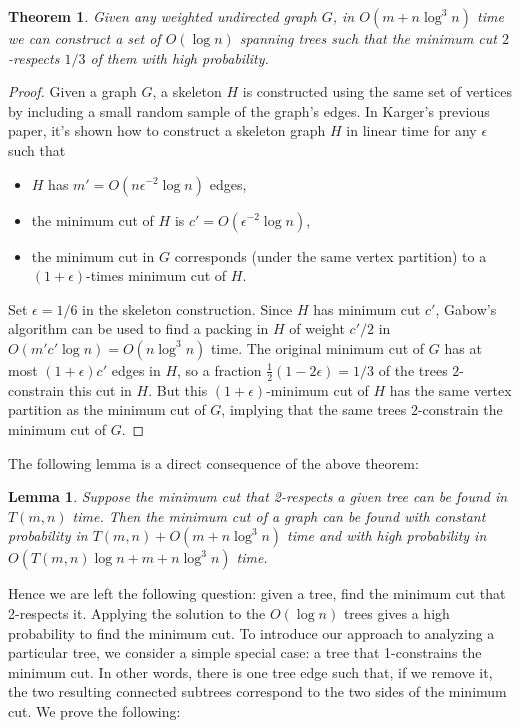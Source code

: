 \documentclass[12pt]{article}
\theoremstyle{plain}
\newtheorem{lemma}{Lemma}[section]
\newtheorem{theorem}{Theorem}[section]
\begin{document}
\begin{theorem}
    \label{theorem:2respect}
    Given any weighted undirected graph $G$, in $O(m+n\log^3 n)$ time we can construct a set of $O(\log n)$ spanning trees such that the minimum cut $2$-respects $1/3$ of them with high probability.
\end{theorem}

\begin{proof}
    Given a graph $G$, a skeleton $H$ is constructed using the same set of vertices by including a small random sample of the graph's edges. In Karger's previous paper\cite{karger1994random}, it's shown how to construct a skeleton graph $H$ in linear time for any $\epsilon$ such that
    \begin{itemize}
    \item $H$ has $m' = O(n\epsilon^{-2}\log n)$ edges,
    \item the minimum cut of $H$ is $c' = O(\epsilon^{-2}\log n)$,
    \item the minimum cut in $G$ corresponds (under the same vertex
      partition) to a $(1+\epsilon)$-times minimum cut of $H$.
    \end{itemize}
    Set $\epsilon=1/6$ in the skeleton construction.  Since $H$ has
    minimum cut $c'$, Gabow's algorithm\cite{gabow1991faster} can be used to find a packing in $H$ of weight $c'/2$ in $O(m'c'\log n)=O(n\log^3 n)$ time.  The original minimum cut of $G$ has at most $(1 +\epsilon)c'$ edges in $H$, so a fraction $\frac12(1-2\epsilon)=1/3$ of the trees $2$-constrain this cut in $H$.  But this $(1+\epsilon)$-minimum cut of $H$ has the same vertex partition as the minimum cut of $G$, implying that the same trees $2$-constrain the minimum cut of $G$.
\end{proof}

The following lemma is a direct consequence of the above theorem:
\begin{lemma}
    \label{lemma:2respect}
    Suppose the minimum cut that 2-respects a given tree can be found in $T(m,n)$ time.  Then the minimum cut of a graph can be found with constant probability in $T(m,n)+O(m+n\log^3 n)$ time and with high probability in $O(T(m,n)\log n+m+n\log^3 n)$ time.
\end{lemma}

Hence we are left the following question: given a tree, find the minimum cut that 2-respects it. Applying the solution to the $O(\log n)$ trees gives a high probability to find the minimum cut. To introduce our approach to analyzing a particular tree, we consider a simple special case: a tree that 1-constrains the minimum cut. In other words, there is one tree edge such that, if we remove it, the two resulting connected subtrees correspond to the two sides of the minimum cut. We prove the following:
\end{document}
